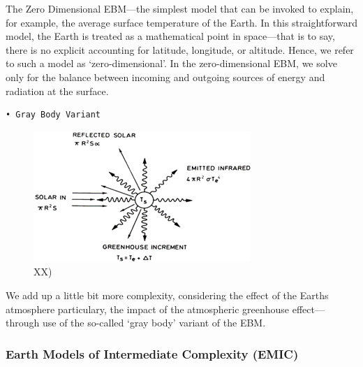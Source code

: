 \documentclass[12pt,oneside]{book}
\begin{document}
The Zero Dimensional EBM---the simplest model that can be invoked to
explain, for example, the average surface temperature of the Earth. In
this straightforward model, the Earth is treated as a mathematical point
in space---that is to say, there is no explicit accounting for latitude,
longitude, or altitude. Hence, we refer to such a model as
`zero-dimensional'. In the zero-dimensional EBM, we solve only for the
balance between incoming and outgoing sources of energy and radiation at
the surface.

\begin{verbatim}
• Gray Body Variant
\end{verbatim}

\begin{figure}

{\centering \includegraphics[width=0.8\linewidth]{figures/Figure710} 

}

\caption{XX)}\label{fig:EnergyBalanceModels2}
\end{figure}

We add up a little bit more complexity, considering the effect of the
Earths atmosphere particulary, the impact of the atmospheric greenhouse
effect---through use of the so-called `gray body' variant of the EBM.

\subsubsection{Earth Models of Intermediate Complexity
(EMIC)}\label{earth-models-of-intermediate-complexity-emic}
\end{document}
